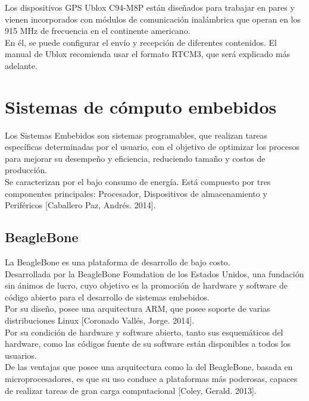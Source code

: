 Los dispositivos GPS Ublox C94-M8P están diseñados para trabajar en pares y vienen incorporados con módulos de comunicación inalámbrica que operan en los 915 MHz de frecuencia en el continente americano. \\

En él, se puede configurar el envío y recepción de diferentes contenidos. El manual de Ublox recomienda usar el formato RTCM3, que será explicado más adelante.

\section{Sistemas de cómputo embebidos}

Los Sistemas Embebidos son sistemas programables, que realizan tareas específicas determinadas por el usuario, con el objetivo de optimizar los procesos para mejorar su desempeño y eficiencia, reduciendo tamaño y costos de producción. \\

Se caracterizan por el bajo consumo de energía. Está compuesto por tres componentes principales: Procesador, Dispositivos de almacenamiento y Periféricos [Caballero Paz, Andrés. 2014].

\subsection{BeagleBone}

La BeagleBone es una plataforma de desarrollo de bajo costo. \\

Desarrollada por la BeagleBone Foundation de los Estados Unidos, una fundación sin ánimos de lucro, cuyo objetivo es la promoción de hardware y software de código abierto para el desarrollo de sistemas embebidos. \\

Por su diseño, posee una arquitectura ARM, que posee soporte de varias distribuciones Linux [Coronado Vallés, Jorge. 2014]. \\

Por su condición de hardware y software abierto, tanto sus esquemáticos del hardware, como las códigos fuente de su software están disponibles a todos los usuarios. \\

De las ventajas que posee una arquitectura como la del BeagleBone, basada en microprocesadores, es que su uso conduce a plataformas más poderosas, capaces de realizar tareas de gran carga computacional [Coley, Gerald. 2013].

